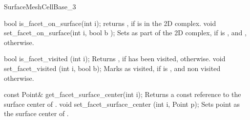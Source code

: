 \begin{ccRefConcept}{SurfaceMeshCellBase_3}
\ccCreation
{}  %



\ccOperations

\ccMethod
{bool is_facet_on_surface(int i);}
{returns , if  is in the 2D complex. }
\ccGlue
\ccMethod
{void set_facet_on_surface(int i, bool b );}
{Sets  as part of the 2D  complex, if  is ,
and , otherwise.}


\ccMethod
{bool is_facet_visited (int i);}
{Returns , if  has been visited,
 otherwise.}
\ccGlue
\ccMethod
{void set_facet_visited (int i, bool b);} 
{Marks  as visited, if  is ,
 and non visited otherwise.}


\ccMethod
{const Point&   get_facet_surface_center(int i);}
{Returns a const reference to the surface center of .}
\ccGlue
\ccMethod
{void set_facet_surface_center (int i, Point p);} 
{Sets point  as the surface center of .}


    




\ccHasModels



\ccSeeAlso

 \\
 \\
\\





\end{ccRefConcept}


